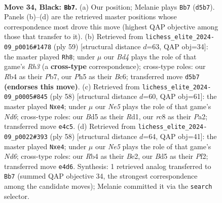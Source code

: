 \documentclass[11pt]{article}
\begin{document}
\clearpage

\begin{figure}[p]\centering
\begin{subfigure}{0.46\textwidth}\centering
\resizebox{\linewidth}{!}{%
\newchessgame
\chessboard[
  setfen={2R5/5pp1/4p2k/1p1b3p/1r1PnP1P/2NBP1P1/8/6K1 b - - 7 34},
  showmover=false,
  pgfstyle=straightmove, color=movearrow, markmove={d5-b7}
]}
\caption{}
\end{subfigure}\hfill
\begin{subfigure}{0.46\textwidth}\centering
\resizebox{\linewidth}{!}{%
\newchessgame
\chessboard[
  setfen={8/1p2k1p1/1pb1p2r/3pPP2/4n3/P1P1BB2/1P4K1/R7 b - - 0 30},
  showmover=false,
  pgfstyle=straightmove, color=movearrow, markmove={h6-h8}
]}
\caption{}
\end{subfigure}
\\[4pt]
\begin{subfigure}{0.46\textwidth}\centering
\resizebox{\linewidth}{!}{%
\newchessgame
\chessboard[
  setfen={6k1/2r3p1/p2Np3/5p2/2P1nb1p/1P6/PB2K1PP/3R4 w - - 1 30},
  showmover=false,
  pgfstyle=straightmove, color=movearrow, markmove={d6-e4}
]}
\caption{}
\end{subfigure}\hfill
\begin{subfigure}{0.46\textwidth}\centering
\resizebox{\linewidth}{!}{%
\newchessgame
\chessboard[
  setfen={3r2k1/5p2/1p1N2p1/p1bnB2p/4p3/1b2P2P/1P2BPP1/2R3K1 w - - 4 30},
  showmover=false,
  pgfstyle=straightmove, color=movearrow, markmove={d6-e4}
]}
\caption{}
\end{subfigure}
\caption{\textbf{Move 34, Black: \texttt{Bb7}.} (a) Our position; Melanie plays \texttt{Bb7} (\texttt{d5b7}). Panels (b)--(d) are the retrieved master positions whose correspondence most drove this move (highest QAP objective among those that transfer to it). (b) Retrieved from \texttt{lichess\_elite\_2024-09\_p0016\#1478} (ply 59) [structural distance $d$=63, QAP obj=34]: the master played \texttt{Rh8}; under $\mu$ our \emph{Bd4} plays the role of that game's \emph{Rh3} (a \textbf{cross-type} correspondence); cross-type roles: our \emph{R}b4 as their \emph{P}b7, our \emph{P}h5 as their \emph{B}c6; transferred move \texttt{d5b7} \textbf{(endorses this move)}. (c) Retrieved from \texttt{lichess\_elite\_2024-09\_p0005\#845} (ply 58) [structural distance $d$=60, QAP obj=61]: the master played \texttt{Nxe4}; under $\mu$ our \emph{Ne5} plays the role of that game's \emph{Nd6}; cross-type roles: our \emph{B}d5 as their \emph{R}d1, our \emph{r}c8 as their \emph{P}a2; transferred move \texttt{e4c5}. (d) Retrieved from \texttt{lichess\_elite\_2024-09\_p0022\#393} (ply 58) [structural distance $d$=64, QAP obj=41]: the master played \texttt{Nxe4}; under $\mu$ our \emph{Ne5} plays the role of that game's \emph{Nd6}; cross-type roles: our \emph{R}b4 as their \emph{B}e2, our \emph{B}d5 as their \emph{P}f2; transferred move \texttt{e4d6}. Synthesis: 1 retrieved analog transferred to \texttt{Bb7} (summed QAP objective 34, the strongest correspondence among the candidate moves); Melanie committed it via the \texttt{search} selector.}
\label{fig:thought-m67}
\end{figure}
\end{document}

